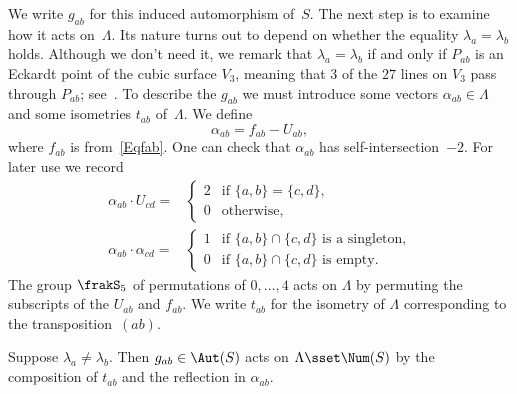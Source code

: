 We write $g_{ab}$ for this induced automorphism of~$S$. The next step is to examine how it acts on~$\Lambda$. Its nature turns out to depend on whether the equality $\lambda_a=\lambda_b$ holds. Although we don't need it, we remark that $\lambda_a=\lambda_b$ if and only if $P_{ab}$ is an Eckardt point of the cubic surface $V_3$, meaning that $3$ of the $27$ lines on $V_3$ pass through $P_{ab}$; see~\cite[Example~9.1.25]{CAG}. To describe the $g_{ab}$ we must introduce some vectors $\alpha_{ab}\in\Lambda$ and some isometries $t_{ab}$ of~$\Lambda$. We define
\begin{equation}\label{Eqalphaab}
\alpha_{ab}=f_{ab}-U_{ab},
\end{equation}
where $f_{ab}$ is from~\eqref{Eqfab}. One can check that $\alpha_{ab}$ has self-intersection~$-2$. For later use we record
\begingroup
\allowdisplaybreaks
\begin{align}\label{EqUdotAlpha}
\alpha_{ab}\cdot U_{cd}={}&
\begin{cases}
2&\text{if }\{a,b\}=\{c,d\},\\
0&\text{otherwise,}
\end{cases}
\\\label{EqAlphaDotAlpha}
\alpha_{ab}\cdot \alpha_{cd}={}&
\begin{cases}
1&\text{if }\{a,b\}\cap\{c,d\}\text{ is a singleton,}\\
0&\text{if }\{a,b\}\cap\{c,d\}\text{ is empty.}
\end{cases}
\end{align}
\endgroup
The group $\frakS_5$ of permutations of $0,\dots,4$ acts on $\Lambda$ by permuting the subscripts of the $U_{ab}$ and $f_{ab}$. We write $t_{ab}$ for the isometry of $\Lambda$ corresponding to the transposition~$(ab)$.

\begin{lemm}\label{L2.3}
Suppose $\lambda_a\neq\lambda_b$. Then $g_{ab}\in\Aut(S)$ acts on $\Lambda\sset\Num(S)$ by the composition of $t_{ab}$ and the reflection in $\alpha_{ab}$.
\end{lemm}

